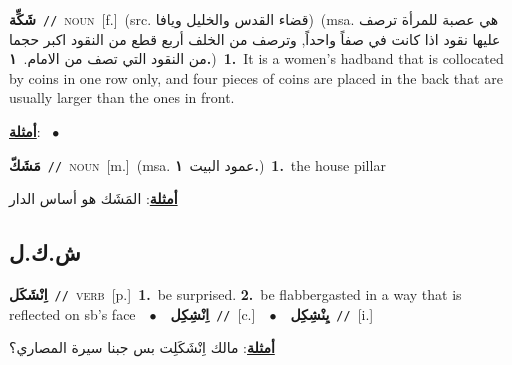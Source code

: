 \documentclass[10pt,a4paper,twoside]{article} %
\begin{document}
\begin{multicols}{2}
{\setlength\topsep{0pt}\textbf{\foreignlanguage{arabic}{شَكِّة}}\ {\color{gray}\texttt{//}\color{black}}\ \textsc{noun}\ [f.]\ (src. \color{gray}\foreignlanguage{arabic}{قضاء القدس والخليل ويافا}\color{black})\ \color{gray}(msa. \foreignlanguage{arabic}{هي عصبة للمرأة ترصف عليها نقود اذا كانت في صفاً واحداً, وترصف من الخلف أربع قطع من النقود اكبر حجما من النقود التي تصف من الامام.}~\foreignlanguage{arabic}{\textbf{١.}})\color{black}\ \textbf{1.}~It is a women's hadband that is collocated by coins in one row only, and four pieces of coins are placed in the back that are usually larger than the ones in front.\  \begin{flushright}\color{gray}\foreignlanguage{arabic}{\textbf{\underline{\foreignlanguage{arabic}{أمثلة}}}: \ $\bullet$\ \  }\end{flushright}\color{black}} \vspace{2mm}

{\setlength\topsep{0pt}\textbf{\foreignlanguage{arabic}{مَشَكّ}}\ {\color{gray}\texttt{//}\color{black}}\ \textsc{noun}\ [m.]\ \color{gray}(msa. \foreignlanguage{arabic}{عمود البيت}~\foreignlanguage{arabic}{\textbf{١.}})\color{black}\ \textbf{1.}~the house pillar\  \begin{flushright}\color{gray}\foreignlanguage{arabic}{\textbf{\underline{\foreignlanguage{arabic}{أمثلة}}}: المَشَك هو أساس الدار}\end{flushright}\color{black}} \vspace{2mm}

\vspace{-3mm}
\subsection*{\color{blue}\foreignlanguage{arabic}{ش.ك.ل}\color{blue}{}} 

{\setlength\topsep{0pt}\textbf{\foreignlanguage{arabic}{اِنْشَكَل}}\ {\color{gray}\texttt{//}\color{black}}\ \textsc{verb}\ [p.]\ \textbf{1.}~be surprised.  \textbf{2.}~be flabbergasted in a way that is reflected on sb's face\ \ $\bullet$\ \ \setlength\topsep{0pt}\textbf{\foreignlanguage{arabic}{اِنْشِكِل}}\ {\color{gray}\texttt{//}\color{black}}\ [c.]\ \ $\bullet$\ \ \setlength\topsep{0pt}\textbf{\foreignlanguage{arabic}{يِنْشِكِل}}\ {\color{gray}\texttt{//}\color{black}}\ [i.]\  \begin{flushright}\color{gray}\foreignlanguage{arabic}{\textbf{\underline{\foreignlanguage{arabic}{أمثلة}}}: مالك اِنْشَكَلِت بس جبنا سيرة المصاري؟}\end{flushright}\color{black}} \vspace{2mm}


\end{multicols}
\end{document}
